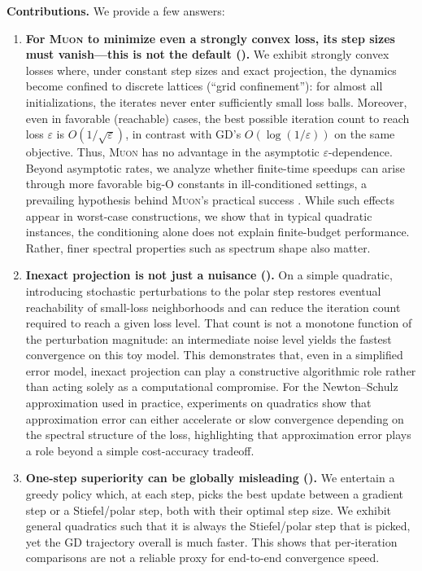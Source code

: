 \documentclass{article}
\theoremstyle{plain}
\theoremstyle{definition}
\theoremstyle{remark}
\newcommand{\GD}{\textsc{GD}}
\newcommand{\Muon}{\textsc{Muon}}
\newcommand{\eps}{\varepsilon}
\begin{document}
\textbf{Contributions.} We provide a few answers:
\begin{enumerate}[
  label=\textbf{A\arabic*:},
  leftmargin=0pt,
  labelindent=0pt,
  labelwidth=!,
  align=left,
  itemsep=0.05em
]
  \item \textbf{
For \Muon{} to minimize even a strongly convex loss, its step sizes must vanish---this is not the default ().}  %
We exhibit strongly convex losses 
where, under 
constant step sizes and exact projection, 
the dynamics become confined to discrete lattices 
(``grid confinement''): 
for almost all initializations, 
the iterates never enter sufficiently small loss balls. 
Moreover, even in favorable (reachable) cases, the best possible iteration count to reach loss $\eps$ is $O(1/\sqrt{\eps})$,
in contrast with \GD{}'s $O(\log(1/\eps))$ on the same objective. Thus, \Muon{} has no advantage in 
the asymptotic
$\eps$-dependence. 
Beyond asymptotic rates, we analyze whether finite-time speedups can arise through more favorable big-O constants in ill-conditioned settings, a prevailing hypothesis behind \Muon{}'s practical success \cite{jordan2024muon}. 
While such effects appear in worst-case constructions, we show that in typical quadratic instances, the conditioning alone does not explain finite-budget performance. Rather, finer spectral properties such as spectrum shape also matter. 

\item \textbf{Inexact projection is not just a nuisance ().} 
On a simple quadratic, introducing stochastic perturbations to the polar step restores eventual reachability of small-loss neighborhoods and can reduce the iteration count required to reach a given loss level. That count is not a monotone function of the perturbation magnitude: an intermediate noise level yields the fastest convergence on this toy model.
This demonstrates that, even in a simplified error model, inexact projection can play a constructive algorithmic role rather than acting solely as a computational compromise. For the Newton--Schulz approximation used in practice, experiments on quadratics show that approximation error can either accelerate or slow convergence depending on the spectral structure of the loss, highlighting that approximation error plays a role beyond a simple cost-accuracy tradeoff. 

\item 
\textbf{One-step superiority can be globally misleading ().}
We entertain a greedy policy which, at each step, picks the best update between a gradient step or a Stiefel/polar step, both with their optimal step size.
We exhibit general quadratics such that it is always the Stiefel/polar step that is picked, yet the \GD{} trajectory overall is much faster.
This shows that per-iteration comparisons are not a reliable proxy for end-to-end convergence speed.
\end{enumerate}
\end{document}
